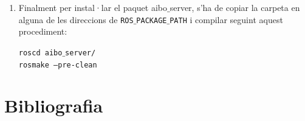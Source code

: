 \documentclass[12pt,a4paper,final,twoside]{article}
\begin{document}
\begin{enumerate}
\item Finalment per instal·lar el paquet aibo$\_$server, s'ha de copiar la carpeta en alguna de les direccions de \texttt{ROS$\_$PACKAGE$\_$PATH} i compilar seguint aquest procediment:

\texttt{roscd aibo$\_$server/}\\
\texttt{rosmake --pre-clean}

\end{enumerate}

\section{Bibliografia}
\end{document}
